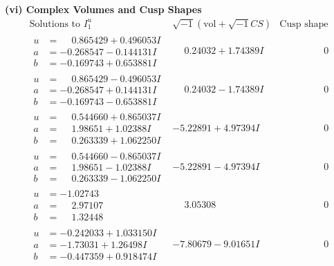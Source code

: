 \documentclass[1p]{elsarticle_modified}
\theoremstyle{definition}
\newcommand{\I}{\sqrt{-1}}
\begin{document}
\newpage\flushleft \textbf{(vi) Complex Volumes and Cusp Shapes}
$$\begin{array}{c|c|c}  
\text{Solutions to }I^u_{1}& \I (\text{vol} + \sqrt{-1}CS) & \text{Cusp shape}\\
 \hline 
\begin{aligned}
u &= \phantom{-}0.865429 + 0.496053 I \\
a &= -0.268547 - 0.144131 I \\
b &= -0.169743 + 0.653881 I\end{aligned}
 & \phantom{-}0.24032 + 1.74389 I & \phantom{-0.000000 } 0 \\ \hline\begin{aligned}
u &= \phantom{-}0.865429 - 0.496053 I \\
a &= -0.268547 + 0.144131 I \\
b &= -0.169743 - 0.653881 I\end{aligned}
 & \phantom{-}0.24032 - 1.74389 I & \phantom{-0.000000 } 0 \\ \hline\begin{aligned}
u &= \phantom{-}0.544660 + 0.865037 I \\
a &= \phantom{-}1.98651 + 1.02388 I \\
b &= \phantom{-}0.263339 + 1.062250 I\end{aligned}
 & -5.22891 + 4.97394 I & \phantom{-0.000000 } 0 \\ \hline\begin{aligned}
u &= \phantom{-}0.544660 - 0.865037 I \\
a &= \phantom{-}1.98651 - 1.02388 I \\
b &= \phantom{-}0.263339 - 1.062250 I\end{aligned}
 & -5.22891 - 4.97394 I & \phantom{-0.000000 } 0 \\ \hline\begin{aligned}
u &= -1.02743\phantom{ +0.000000I} \\
a &= \phantom{-}2.97107\phantom{ +0.000000I} \\
b &= \phantom{-}1.32448\phantom{ +0.000000I}\end{aligned}
 & \phantom{-}3.05308\phantom{ +0.000000I} & \phantom{-0.000000 } 0 \\ \hline\begin{aligned}
u &= -0.242033 + 1.033150 I \\
a &= -1.73031 + 1.26498 I \\
b &= -0.447359 + 0.918474 I\end{aligned}
 & -7.80679 - 9.01651 I & \phantom{-0.000000 } 0 \\ \hline\begin{aligned}

\end{aligned}
\end{array}$$
\end{document}
